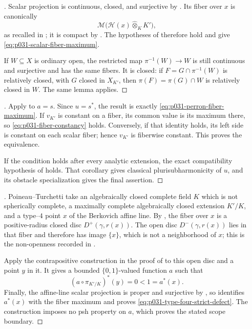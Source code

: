 \begin{proof}[]
Scalar projection is continuous, closed, and surjective by
\cite[\S2.9]{GR25Classical}.  Its fiber over $x$ is canonically
\[
       \mathcal M\bigl(\mathcal H(x)\widehat\otimes_KK'\bigr),
\]
as recalled in ; it is compact by
.  The hypotheses of
 therefore hold and give
\eqref{eq:p031-scalar-fiber-maximum}.

If $W\subseteq X$ is ordinary open, the restricted map
$
 \pi^{-1}(W)\to W
$
is still continuous and surjective and has the same fibers.  It is closed:
if $F=G\cap\pi^{-1}(W)$ is relatively closed, with $G$ closed in
$X_{K'}$, then
$
 \pi(F)=\pi(G)\cap W
$
is relatively closed in $W$.  The same lemma applies.
\end{proof}

\begin{proof}[]
Apply  to $a=s$.  Since
$u=s^*$, the result is exactly
\eqref{eq:p031-perron-fiber-maximum}.  If $v_{K'}$ is constant on a
fiber, its common value is its maximum there, so
\eqref{eq:p031-fiber-constancy} holds.  Conversely, if that identity
holds, its left side is constant on each scalar fiber; hence $v_{K'}$ is
fiberwise constant.  This proves the equivalence.

If the condition holds after every analytic extension, the exact
compatibility hypothesis of
 holds.  That corollary gives
classical plurisubharmonicity of $u$, and its obstacle specialization gives
the final assertion.
\end{proof}

\begin{proof}[
]
Poineau--Turchetti take an algebraically closed complete field $K$ which
is not spherically complete, a maximally complete algebraically closed
extension $K'/K$, and a type--$4$ point $x$ of the Berkovich affine
line.  By \cite[Lemma~5.6.2]{PT21SchottkyI}, the fiber over $x$ is a
positive-radius closed disc $D^+(\gamma,r(x))$.  The open disc
$D^-(\gamma,r(x))$ lies in that fiber and therefore has image $\{x\}$,
which is not a neighborhood of $x$; this is the non-openness recorded in
\cite[Remark~5.6.4]{PT21SchottkyI}.

Apply the contrapositive construction in the proof of
 to this open disc and a point
$y$ in it.  It gives a bounded $\{0,1\}$-valued function $a$ such that
\[
                 (a\circ\pi_{K'/K})^*(y)=0<1=a^*(x).
\]
Finally, the affine-line scalar projection is proper and surjective by
\cite[Proposition~5.6.1]{PT21SchottkyI}, so
 identifies $a^*(x)$ with the
fiber maximum and proves \eqref{eq:p031-type-four-strict-defect}.  The
construction imposes no psh property on $a$, which proves the stated
scope boundary.
\end{proof}
